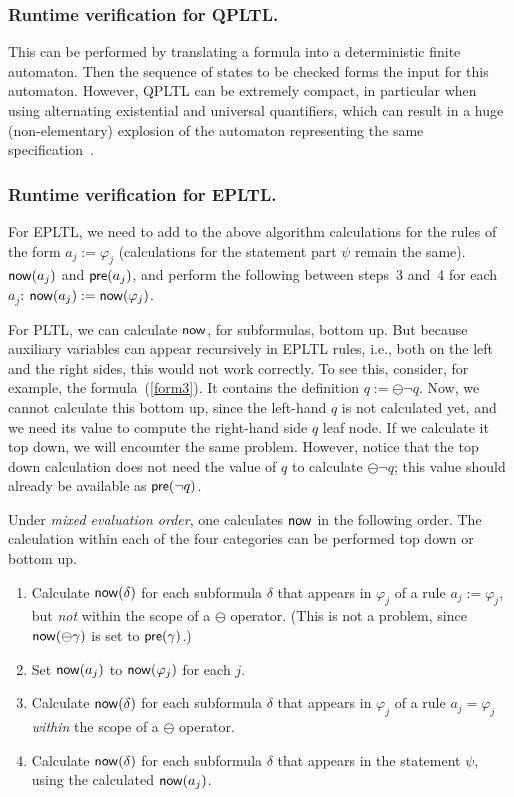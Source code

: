 \subsubsection*{Runtime verification for QPLTL.}  This can be performed by translating a
formula into a deterministic finite automaton. Then the sequence of states to be checked forms the input for this automaton. 
However, QPLTL can be extremely compact, in particular when using alternating existential and universal 
quantifiers, which can result in a huge (non-elementary) explosion of
the automaton representing the same
specification~\cite{Thomas}.


\subsubsection*{Runtime verification for EPLTL.} For EPLTL,  we need to  add to the above
algorithm calculations for the rules of
the form $a_j := \varphi_j$ (calculations
for the statement part $\psi$ remain the same).
$\mathsf{now} ( a_j )$ and $\mathsf{pre} ( a_j )$,
and perform the following between steps~3 and~4 for each $a_j$: $\mathsf{now} ( a_j ) := \mathsf{now} ( \varphi_j )$.

For PLTL, we can calculate  $\mathsf{now}$, for subformulas,
bottom up. But
because
auxiliary variables can appear recursively in EPLTL rules, i.e., both on the left and the right sides,
this would not work correctly. To see this, consider, for example, the formula~(\ref{form3}). It contains
the definition $q := \ominus \neg q$. Now, we cannot calculate this
bottom up, since the left-hand $q$ is not calculated yet, and we need its value to compute the right-hand side $q$ leaf node.
If we calculate it top down, we will encounter the same problem.
However, notice that the top down calculation does not need the
value of $q$ to calculate $\ominus \neg q$; this value should already be available as $\mathsf{pre} ( \neg q )$.


Under {\em mixed evaluation order}, one calculates $\mathsf{now}$ in the following order. The calculation within each of the four categories can be performed top down or bottom up.

\begin{enumerate}
\item Calculate 
$\mathsf{now} ( \delta )$ for each subformula $\delta$
that appears in $\varphi_j$ of a rule
$a_j := \varphi_j$, but {\em not} within the scope of
a $\ominus$ operator. (This is not
a problem, since
$\mathsf{now} ( \ominus \gamma )$ is set to $\mathsf{pre} ( \gamma )$.)
\item Set 
$\mathsf{now} ( a_j )$ to $\mathsf{now} ( \varphi_j )$ for each $j$.
\item Calculate $\mathsf{now} ( \delta )$ for each subformula $\delta$
that appears in $\varphi_j$ of a rule
$a_j = \varphi_j$ {\em  within} the scope of
a $\ominus$ operator.
\item Calculate $\mathsf{now} ( \delta )$ for each subformula $\delta$
that appears in the statement $\psi$, using the calculated $\mathsf{now} ( a_j )$.
\end{enumerate}



